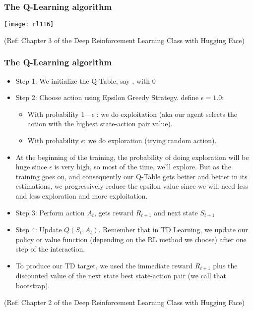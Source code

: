 \begin{frame}[fragile]\frametitle{The Q-Learning algorithm}


\begin{center}
\texttt{[image: rl116]}
\end{center}

{\tiny (Ref: Chapter 3 of the Deep Reinforcement Learning Class with Hugging Face)}

\end{frame}

\begin{frame}[fragile]\frametitle{The Q-Learning algorithm}

\begin{itemize}
\item Step 1: We initialize the Q-Table, say , with 0
\item Step 2: Choose action using Epsilon Greedy Strategy.  define $\epsilon = 1.0$:
\begin{itemize}
\item With probability $1 — \epsilon$ : we do exploitation (aka our agent selects the action with the highest state-action pair value).
\item With probability $\epsilon$: we do exploration (trying random action). 
\end{itemize}
\item At the beginning of the training, the probability of doing exploration will be huge since $\epsilon$ is very high, so most of the time, we'll explore. But as the training goes on, and consequently our Q-Table gets better and better in its estimations, we progressively reduce the epsilon value since we will need less and less exploration and more exploitation.
\item Step 3: Perform action $A_t$, gets reward $R_{t+1}$ and next state $S_{t+1}$
\item Step 4: Update $Q(S_t, A_t)$. Remember that in TD Learning, we update our policy or value function (depending on the RL method we choose) after one step of the interaction.
\item To produce our TD target, we used the immediate reward $R_{t+1}$ plus the discounted value of the next state best state-action pair (we call that bootstrap).

\end{itemize}



{\tiny (Ref: Chapter 2 of the Deep Reinforcement Learning Class with Hugging Face)}

\end{frame}

